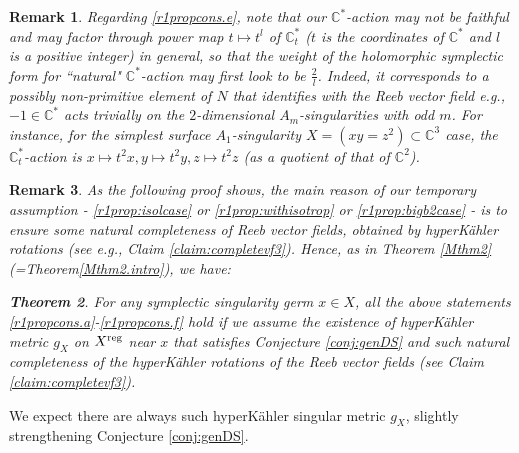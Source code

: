 \documentclass[12pt,a4paper]{amsart}
\newtheorem{Thm}{Theorem}[section]
\newtheorem{Rem}[Thm]{Remark}
\theoremstyle{remark}
\theoremstyle{definition}
\def\C{\mathbb{C}}
\begin{document}
\begin{Rem}\label{nonfaithful}
Regarding \ref{r1propcons.e}, 
note that our $\C^*$-action may {\it not} be faithful 
and may factor through power map $t\mapsto t^l$ of $\C^*_t$ ($t$ is the 
coordinates of $\C^*$ and $l$ is a positive integer) in general, 
so that the weight of the holomorphic symplectic form for 
``natural" $\C^*$-action 
may first look to be $\frac{2}{l}$. 
Indeed, it corresponds to a possibly non-primitive element of $N$ 
that identifies with the Reeb vector field 
e.g., $-1\in \C^*$ acts trivially on the $2$-dimensional 
$A_{m}$-singularities with odd $m$. For instance, for the simplest surface 
$A_1$-singularity $X=(xy=z^2)\subset \C^3$ case, 
the $\C^*_t$-action is $x\mapsto t^2x, y\mapsto t^2y, z\mapsto t^2z$ (as a 
quotient of that of $\C^2$). 
\end{Rem}

\begin{Rem}
As the following proof shows, the main reason of 
our temporary assumption - \eqref{r1prop:isolcase} or 
\eqref{r1prop:withisotrop} or  \eqref{r1prop:bigb2case} - 
is to ensure some natural 
completeness of Reeb vector fields, 
obtained by 
hyperK\"ahler rotations (see e.g., Claim \ref{claim:completevf3}). 
Hence, as in Theorem \ref{Mthm2}(=Theorem\ref{Mthm2.intro}), we have: 
\begin{Thm}
For any symplectic singularity germ $x\in X$, all the above statements 
\ref{r1propcons.a}-\ref{r1propcons.f} hold 
if we assume the existence of hyperK\"ahler metric $g_X$ 
on $X^{\rm reg}$ near $x$ 
that satisfies Conjecture \ref{conj:genDS} and such natural 
completeness of the hyperK\"ahler rotations of the 
Reeb vector fields (see Claim \ref{claim:completevf3}). 
\end{Thm}
\end{Rem}
We expect there are always such hyperK\"ahler singular metric $g_X$, 
slightly strengthening Conjecture \ref{conj:genDS}. 
\end{document}
